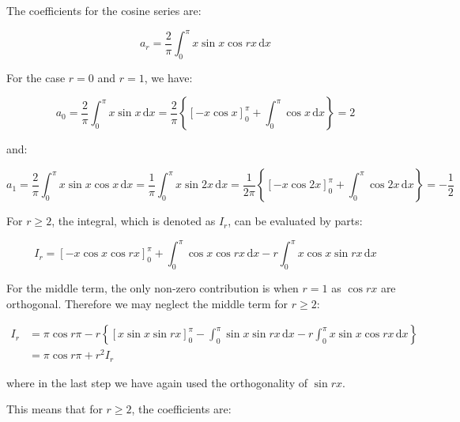 \documentclass[12pt]{article}
\begin{document}

The coefficients for the cosine series are:

\begin{equation}
    a_{r} = \frac{2}{\pi} \int_{0}^{\pi} x \sin{x} \cos{rx} \, \mathrm{d}x
\end{equation}

For the case $r = 0$ and $r = 1$, we have:

\begin{equation}
    a_{0} = \frac{2}{\pi} \int_{0}^{\pi} x \sin{x} \, \mathrm{d}x = \frac{2}{\pi} \left\{ \left[ -x \cos{x} \right]_{0}^{\pi} + \int_{0}^{\pi} \cos{x} \, \mathrm{d}x \right\} = 2
\end{equation}

and:

\begin{equation}
    a_{1} = \frac{2}{\pi} \int_{0}^{\pi} x \sin{x} \cos{x} \, \mathrm{d}x = \frac{1}{\pi} \int_{0}^{\pi} x \sin{2x} \, \mathrm{d}x = \frac{1}{2\pi} \left\{ \left[ -x \cos{2x} \right]_{0}^{\pi} + \int_{0}^{\pi} \cos{2x} \, \mathrm{d}x \right\} = -\frac{1}{2}
\end{equation}

For $r \ge 2$, the integral, which is denoted as $I_{r}$, can be evaluated by parts:

\begin{equation}
    I_{r} = \left[ -x \cos{x} \cos{rx} \right]_{0}^{\pi} + \int_{0}^{\pi} \cos{x} \cos{rx} \, \mathrm{d}x - r \int_{0}^{\pi} x \cos{x} \sin{rx} \, \mathrm{d}x
\end{equation}

For the middle term, the only non-zero contribution is when $r = 1$ as $\cos{rx}$ are orthogonal. Therefore we may neglect the middle term for $r \ge 2$:

\begin{equation}
\begin{split}
    I_{r} &= \pi \cos{r\pi} - r \left\{ \left[ x \sin{x} \sin{rx} \right]_{0}^{\pi} - \int_{0}^{\pi} \sin{x} \sin{rx} \, \mathrm{d}x - r \int_{0}^{\pi} x \sin{x} \cos{rx} \, \mathrm{d}x \right\} \\
    &= \pi \cos{r\pi} + r^{2} I_{r}
\end{split}
\end{equation}

where in the last step we have again used the orthogonality of $\sin{rx}$.

This means that for $r \ge 2$, the coefficients are:
\end{document}
